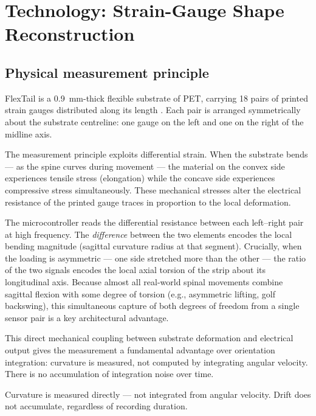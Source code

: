 \section{Technology: Strain-Gauge Shape Reconstruction}

\subsection{Physical measurement principle}

FlexTail is a \SI{0.9}{\milli\metre}-thick flexible substrate of \ac{PET},
carrying 18 pairs of printed strain gauges distributed along its
length \cite{walkling2025, minktec2025}.
Each pair is arranged symmetrically about the substrate centreline: one gauge on the
left and one on the right of the midline axis.

The measurement principle exploits differential strain.
When the substrate bends --- as the spine curves during movement --- the material on the
convex side experiences tensile stress (elongation) while the concave side experiences
compressive stress simultaneously.
These mechanical stresses alter the electrical resistance of the printed gauge traces
in proportion to the local deformation.

The microcontroller reads the differential resistance between each left--right pair
at high frequency.
The \emph{difference} between the two elements encodes the local bending magnitude
(sagittal curvature radius at that segment).
Crucially, when the loading is asymmetric --- one side stretched more than the other ---
the ratio of the two signals encodes the local axial torsion of the strip about its
longitudinal axis.
Because almost all real-world spinal movements combine sagittal flexion with some
degree of torsion (e.g., asymmetric lifting, golf backswing), this simultaneous
capture of both degrees of freedom from a single sensor pair is a key architectural
advantage.

This direct mechanical coupling between substrate deformation and electrical output
gives the measurement a fundamental advantage over orientation integration:
curvature is measured, not computed by integrating angular velocity.
There is no accumulation of integration noise over time.

\begin{factboxfire}
    Curvature is measured directly --- not integrated from angular velocity.
    Drift does not accumulate, regardless of recording duration.
\end{factboxfire}

